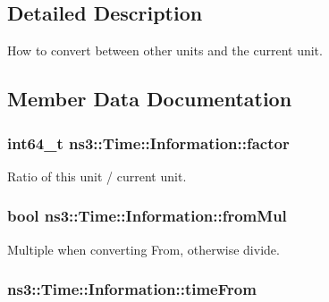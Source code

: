 \subsection{Detailed Description}
How to convert between other units and the current unit. 

\subsection{Member Data Documentation}
\subsubsection[{\texorpdfstring{factor}{factor}}]{\setlength{\rightskip}{0pt plus 5cm}int64\+\_\+t ns3\+::\+Time\+::\+Information\+::factor}\hypertarget{structns3_1_1Time_1_1Information_a0919ab79c4545807c083ff3b2a382c81}{}\label{structns3_1_1Time_1_1Information_a0919ab79c4545807c083ff3b2a382c81}


Ratio of this unit / current unit. 

\subsubsection[{\texorpdfstring{from\+Mul}{fromMul}}]{\setlength{\rightskip}{0pt plus 5cm}bool ns3\+::\+Time\+::\+Information\+::from\+Mul}\hypertarget{structns3_1_1Time_1_1Information_a9627bc334dac20619a1ef17a7b2d6f85}{}\label{structns3_1_1Time_1_1Information_a9627bc334dac20619a1ef17a7b2d6f85}


Multiple when converting From, otherwise divide. 

\subsubsection[{\texorpdfstring{time\+From}{timeFrom}}]{ ns3\+::\+Time\+::\+Information\+::time\+From}\hypertarget{structns3_1_1Time_1_1Information_a3d78392b5f36cdef34b72c7ea14988e9}{}\label{structns3_1_1Time_1_1Information_a3d78392b5f36cdef34b72c7ea14988e9}


